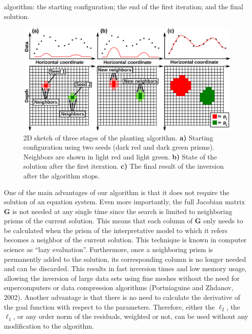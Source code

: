 \documentclass{segabs}
\begin{document}
algorithm: the starting configuration; the end of the first iteration; and the final solution.
\\
\begin{figure}[ht]
    \vspace{-0.3cm}
    \includegraphics[width=\columnwidth]{scheme.png}
    \caption{2D sketch of three stages of the planting algorithm. \textbf{a)} Starting configuration
    using two seeds (dark red and dark green prisms). Neighbors are shown in light red and
    light green.
    \textbf{b)} State of the solution after the first iteration. \textbf{c)} The final
    result of the inversion after the algorithm stops.
    \label{fig:scheme}}
    \vspace{-0.3cm}
\end{figure}

One of the main advantages of our algorithm is that it does not require the solution of
an equation system. Even more importantly, the full Jacobian matrix $\mathbf{G}$ is
not needed at any single time since the search is limited to neighboring prisms of the
current solution. This means that each column of $\mathbf{G}$ only needs to be calculated
when the prism of the interpretative model to which it refers becomes a neighbor of the
current solution. This technique is known in computer science as ``lazy evaluation''.
Furthermore, once a neighboring prism is permanently added to the solution, its corresponding
column is no longer needed and can be discarded.
This results in fast inversion times and low memory usage, allowing the inversion of large
data sets using fine meshes without the need for supercomputers or data compression algorithms
(Portniaguine and Zhdanov, 2002).
Another advantage is that there is no need to calculate the derivative of the goal function
with respect to the parameters. Therefore, either the $\ell_2$, the $\ell_1$, or any order norm of the
residuals, weighted or not, can be used without any modification to the algorithm.
\end{document}
